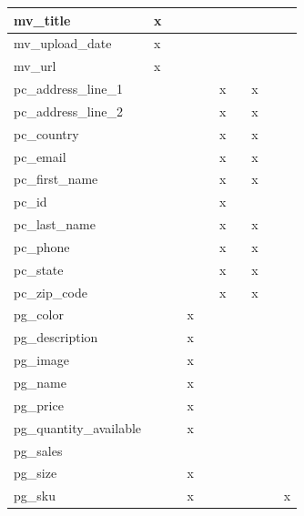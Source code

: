 \documentclass[11pt, a4paper]{report}
\begin{document}
\begin{longtable}{|l|l|l|l|l|l|l|l|l|l|}
mv\_title               & x              &   &   &   &   &   &   &   &   \\ \hline
mv\_upload\_date        & x              &   &   &   &   &   &   &   &   \\ \hline
mv\_url                 & x              &   &   &   &   &   &   &   &   \\ \hline
pc\_address\_line\_1    &                &   &   &   & x &   & x &   &   \\ \hline
pc\_address\_line\_2    &                &   &   &   & x &   & x &   &   \\ \hline
pc\_country             &                &   &   &   & x &   & x &   &   \\ \hline
pc\_email               &                &   &   &   & x &   & x &   &   \\ \hline
pc\_first\_name         &                &   &   &   & x &   & x &   &   \\ \hline
pc\_id                  &                &   &   &   & x &   &   &   &   \\ \hline
pc\_last\_name          &                &   &   &   & x &   & x &   &   \\ \hline
pc\_phone               &                &   &   &   & x &   & x &   &   \\ \hline
pc\_state               &                &   &   &   & x &   & x &   &   \\ \hline
pc\_zip\_code           &                &   &   &   & x &   & x &   &   \\ \hline
pg\_color               &                &   & x &   &   &   &   &   &   \\ \hline
pg\_description         &                &   & x &   &   &   &   &   &   \\ \hline
pg\_image               &                &   & x &   &   &   &   &   &   \\ \hline
pg\_name                &                &   & x &   &   &   &   &   &   \\ \hline
pg\_price               &                &   & x &   &   &   &   &   &   \\ \hline
pg\_quantity\_available &                &   & x &   &   &   &   &   &   \\ \hline
pg\_sales               &                &   &   &   &   &   &   &   &   \\ \hline
pg\_size                &                &   & x &   &   &   &   &   &   \\ \hline
pg\_sku                 &                &   & x &   &   &   &   &   & x \\ \hline

\end{longtable}
\end{document}
